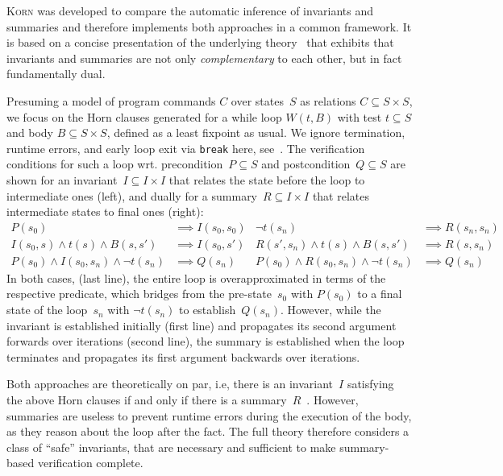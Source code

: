 \documentclass{llncs}
\newcommand{\Korn}{\textsc{Korn}\xspace}
\begin{document}
\Korn was developed to compare the automatic inference of invariants and summaries
and therefore implements both approaches in a common framework.
It is based on a concise presentation of the underlying theory~\cite{ernst:arxiv2020:summaries}
that exhibits that invariants and summaries are not only \emph{complementary} to each other, but in fact fundamentally dual.

Presuming a model of program commands $C$ over states~$S$ as relations $C \subseteq S \times S$,
we focus on the Horn clauses generated for a while loop $W(t,B)$ with test $t \subseteq S$ and body $B \subseteq S \times S$,
defined as a least fixpoint as usual. We ignore termination, runtime errors, and early loop exit via \texttt{break} here, see~\cite{ernst:arxiv2020:summaries}.
The verification conditions for such a loop wrt. precondition~$P \subseteq S$ and postcondition~$Q \subseteq S$
are shown for an invariant~$I \subseteq I \times I$ that relates the state before the loop to intermediate ones (left),
and dually for a summary~$R \subseteq I \times I$ that relates intermediate states to final ones (right):
\small
\begin{align*}
    P(s_0)
        & \implies I(s_0,s_0)
  & \lnot t(s_n)
        & \implies R(s_n,s_n)
  \\
    I(s_0,s) \land t(s) \land B(s,s')
        & \implies I(s_0,s')
  & R(s',s_n) \land t(s) \land B(s,s')
        & \implies R(s,s_n)
  \\
    P(s_0) \land I(s_0,s_n) \land \lnot t(s_n)
        & \implies Q(s_n)
  & P(s_0) \land R(s_0,s_n) \land \lnot t(s_n)
        & \implies Q(s_n)
\end{align*}
\normalsize
In both cases, (last line), the entire loop is overapproximated in terms of the respective predicate,
which bridges from the pre-state~$s_0$ with $P(s_0)$ to a final state of the loop~$s_n$ with $\lnot t(s_n)$ to establish~$Q(s_n)$.
However, while the invariant is established initially (first line) and propagates its second argument forwards over iterations (second line),
the summary is established when the loop terminates and propagates its first argument backwards over iterations.

Both approaches are theoretically on par, i.e, there is an invariant~$I$ satisfying the above Horn clauses
if and only if there is a summary~$R$~\cite[Prop.~1 and~2]{ernst:arxiv2020:summaries}.
However, summaries are useless to prevent runtime errors during the execution of the body,
as they reason about the loop after the fact. The full theory therefore considers a class of ``safe'' invariants,
that are necessary and sufficient to make summary-based verification complete.
\end{document}
